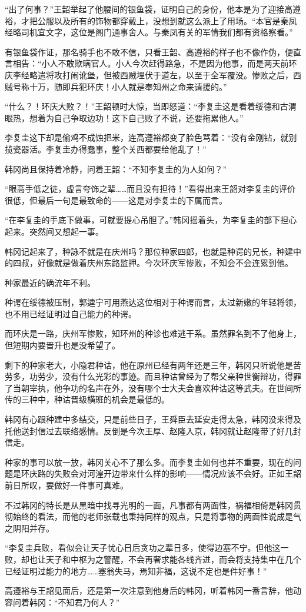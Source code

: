 “出了何事？”王韶举起了他腰间的银鱼袋，证明自己的身份，他本是为了迎接高遵裕，才把公服以及所有的饰物都穿戴上，没想到就这么派上了用场。“本官是秦凤经略司机宜文字，这位是阁门通事舍人。与秦凤有关的军情我们都有资格察看。”

有银鱼袋作证，那名骑手也不敢不信，只看王韶、高遵裕的样子也不像作伪，便直言相告：“小人不敢欺瞒官人。小人今次赶得路急，不是因为他事，而是两天前环庆李经略遣将攻打闹讹堡，但被西贼埋伏于道左，以至于全军覆没。惨败之后，西贼号称十万，随即兵犯环庆！小人就是奉知州之命来请援的。”

“什么？！环庆大败？！”王韶顿时大惊，当即怒道：“李复圭这是看着绥德和古渭眼热，想着为自己争取边功！这下自己败了不说，还要拖累他人。”

李复圭这下却是偷鸡不成蚀把米，连高遵裕都变了脸色骂着：“没有金刚钻，就别揽瓷器活。李复圭办得蠢事，整个关西都要给他乱了！”

韩冈尚且保持着冷静，问着王韶：“不知李复圭的为人如何？”

“眼高手低之徒，虚言夸饰之辈……而且没有担待！”看得出来王韶对李复圭的评价很低，但最后一句是最致命的——这是对李复圭的下属而言。

“在李复圭的手底下做事，可就要提心吊胆了。”韩冈摇着头，为李复圭的部下担心起来。突然间又想起一事。

韩冈记起来了，种詠不就是在庆州吗？那位种家四郎，也就是种谔的兄长，种建中的四叔，好像就是做着庆州东路监押。今次环庆军惨败，不知会不会连累到他。

种家最近的确流年不利。

种谔在绥德被压制，郭逵宁可用燕达这位相对于种谔而言，太过新嫩的年轻将领，也不用已经证明过自己能力的种谔。

而环庆是一路，庆州军惨败，知环州的种诊也难逃干系。虽然罪名到不了他身上，但短期内要晋升也是没希望了。

剩下的种家老大，小隐君种诂，他在原州已经有两年还是三年，韩冈只听说他是苦劳多，功劳少，没有什么光彩的事迹。而且种诂曾经为了帮父亲种世衡辩功，得罪了当朝宰执，他争功的名声在外，没有哪个士大夫会喜欢种诂这等武夫。在世间所传的三种中，种诂晋级横班的机会是最低的。

韩冈有心跟种建中多结交，只是前些日子，王舜臣去延安走得太急，韩冈没来得及托他送封信过去联络感情。反倒是今次王厚、赵隆入京，韩冈就让赵隆带了好几封信走。

种家的事可以放一放，韩冈关心不了那么多。而李复圭如何也并不重要，现在的问题是环庆路的失败会对河湟开边带来什么样的影响——情况应该不会好。正如王韶前日所叹，要做好一件事可真难。

不过韩冈的特长是从黑暗中找寻光明的一面，凡事都有两面性，祸福相倚是韩冈贯彻始终的看法，而他的老师张载也秉持同样的观点，只是将事物的两面性说成是气之阴阳并存。

“李复圭兵败，看似会让天子忧心日后贪功之辈日多，使得边塞不宁。但他这一败，却也让天子和中枢为之警醒，不会再奢求能各线齐进，而会将支持集中在几个已经证明过能力的地方……塞翁失马，焉知非福，这说不定也是件好事！”

高遵裕与王韶见面后，还是第一次注意到他身后的韩冈，听着韩冈一番言辞，他动容问着韩冈：“不知君乃何人？”

